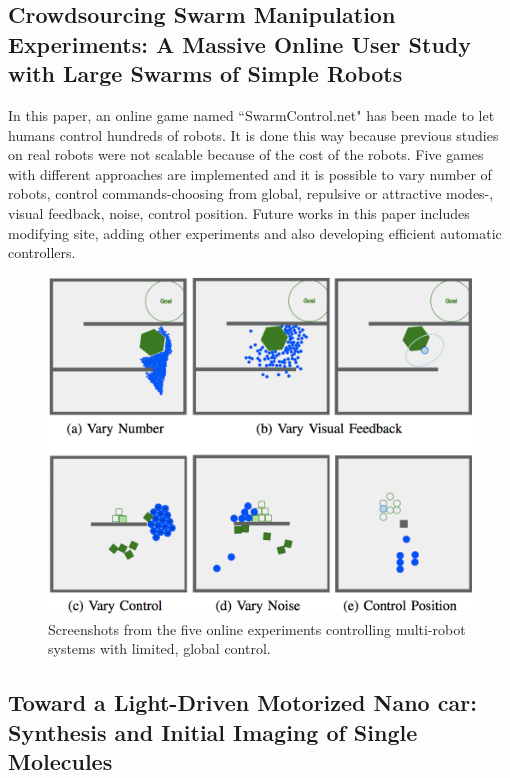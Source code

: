 \documentclass[letterpaper, 10 pt, conference]{ieeeconf}
\begin{document}
\subsection{Crowdsourcing Swarm Manipulation Experiments: A Massive Online User Study with Large Swarms of Simple Robots}

In this paper, an online game named ``SwarmControl.net" has been made to let humans control hundreds of robots.\cite{swarmcontrol2013} It is done this way because previous studies on real robots were not scalable because of the cost of the robots. Five games with different approaches are implemented and it is possible to vary number of robots, control commands-choosing from global, repulsive or attractive modes-, visual feedback, noise, control position. Future works in this paper includes modifying site, adding other experiments and also developing efficient automatic controllers.
\begin{figure}[h]
\begin{center}
\includegraphics[width=\columnwidth]{SwarmBecker.png}
\caption{Screenshots from the five online experiments controlling multi-robot systems with limited, global control.\cite{swarmcontrol2013}
\label{fig:swarmcontrol.net}}
\end{center}
\end{figure} 

\subsection{Toward a Light-Driven Motorized Nano car: Synthesis and Initial Imaging of Single Molecules}
\end{document}
